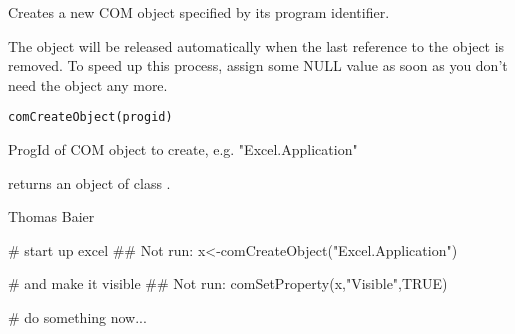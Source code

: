 \begin{Description}\relax
Creates a new COM object specified by its program identifier.

The object will be released automatically when the last reference to the
object is removed. To speed up this process, assign some NULL value as soon
as you don't need the object any more.
\end{Description}
\begin{Usage}
\begin{verbatim}
comCreateObject(progid)
\end{verbatim}
\end{Usage}
\begin{Arguments}
\begin{ldescription}
\item[\code{progid}] ProgId of COM object to create, e.g. "Excel.Application"
\end{ldescription}
\end{Arguments}
\begin{Value}
 returns an object of class .
\end{Value}
\begin{Author}\relax
Thomas Baier
\end{Author}
\begin{Examples}
\begin{ExampleCode}
# start up excel
## Not run: x<-comCreateObject("Excel.Application")

# and make it visible
## Not run: comSetProperty(x,"Visible",TRUE)

# do something now...
\end{ExampleCode}
\end{Examples}

